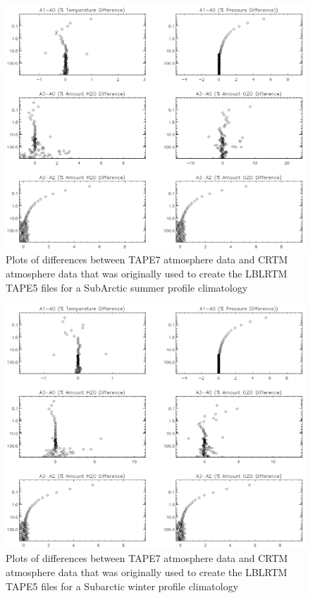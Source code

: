 \begin{figure}[htp]
  \centering{}
  \includegraphics[scale=0.8]{./graphics/Atmosphere_Differences_14.eps}
  \caption{Plots of differences between TAPE7 atmosphere data and CRTM atmosphere data
  that was originally used to create the LBLRTM TAPE5 files for a SubArctic summer profile climatology}
  \label{fig:Differences_Subarctic_summer}
\end{figure}

\begin{figure}[htp]
  \centering{}
  \includegraphics[scale=0.8]{./graphics/Atmosphere_Differences_15.eps}
  \caption{Plots of differences between TAPE7 atmosphere data and CRTM atmosphere data
  that was originally used to create the LBLRTM TAPE5 files for a Subarctic winter profile climatology}
  \label{fig:Differences_Subarctic_winter}
\end{figure}



